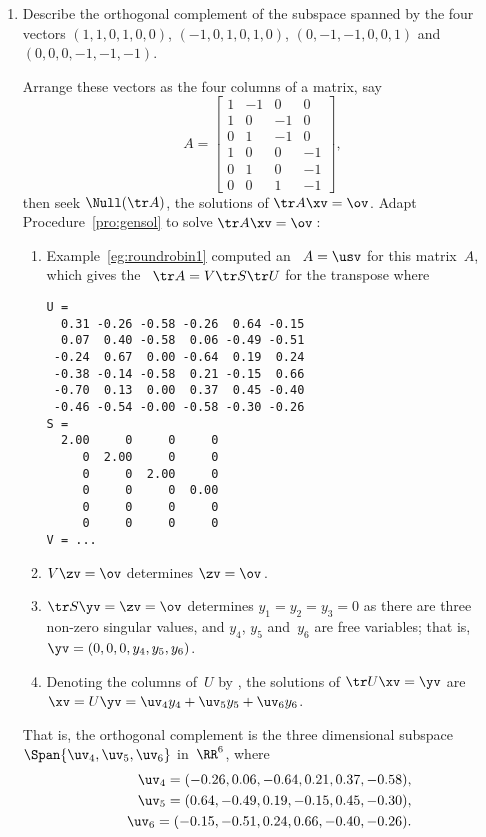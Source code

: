 \begin{example}
\begin{enumerate}
\item\label{eg:nulltrw:d} Describe the orthogonal complement of the subspace spanned by the four vectors \((1,1,0,1,0,0)\), \((-1,0,1,0,1,0)\), \((0,-1,-1,0,0,1)\) and \((0,0,0,-1,-1,-1)\).
\begin{solution} 
Arrange these vectors as the four columns of a matrix, say
\setbox\ajrqrbox\hbox{}%
\marginpar{\usebox{\ajrqrbox\\[2ex]}}%
\begin{equation*}
A=\begin{bmatrix}    1 & -1 & 0 & 0
\\ 1 & 0 & -1 & 0
\\ 0 & 1 & -1 & 0
\\ 1 & 0 & 0 & -1
\\ 0 & 1 & 0 & -1
\\ 0 & 0 & 1 & -1
 \end{bmatrix},
\end{equation*}
then seek \(\Null(\tr A)\), the solutions of \(\tr A\xv=\ov\).
Adapt Procedure~\ref{pro:gensol} to solve \(\tr A\xv=\ov\)\,:
\begin{enumerate}
\item Example~\ref{eg:roundrobin1} computed an \svd\ \(A=\usv\) for this matrix~\(A\), which gives the \svd\ \(\tr A=V\tr S\tr U\) for the transpose where \twodp
\begin{verbatim}
U =
  0.31 -0.26 -0.58 -0.26  0.64 -0.15
  0.07  0.40 -0.58  0.06 -0.49 -0.51
 -0.24  0.67  0.00 -0.64  0.19  0.24
 -0.38 -0.14 -0.58  0.21 -0.15  0.66
 -0.70  0.13  0.00  0.37  0.45 -0.40
 -0.46 -0.54 -0.00 -0.58 -0.30 -0.26
S =
  2.00     0     0     0
     0  2.00     0     0
     0     0  2.00     0
     0     0     0  0.00
     0     0     0     0
     0     0     0     0
V = ...
\end{verbatim}

\item \(V\zv=\ov\) determines \(\zv=\ov\)\,.
\item \(\tr S\yv=\zv=\ov\) determines \(y_1=y_2=y_3=0\) as there are three non-zero singular values, and \(y_4\), \(y_5\) and~\(y_6\) are free variables; that is, \(\yv=(0,0,0,y_4,y_5,y_6)\).
\item Denoting the columns of~\(U\) by \hlist{}, the solutions of \(\tr U\xv=\yv\) are \(\xv=U\yv=\uv_4y_4+\uv_5y_5+\uv_6y_6\).
\end{enumerate}
That is, the orthogonal complement is the three dimensional subspace \(\Span\{\uv_4,\uv_5,\uv_6\}\) in~\(\RR^6\),  where \twodp\
\begin{eqnarray*}
&&\uv_4=(-0.26,0.06,-0.64,0.21,0.37,-0.58),
\\&&\uv_5=(0.64,-0.49,0.19,-0.15,0.45,-0.30), 
\\&&\uv_6=(-0.15,-0.51,0.24,0.66,-0.40,-0.26).
\end{eqnarray*}
\end{solution}

\end{enumerate}
\end{example}


